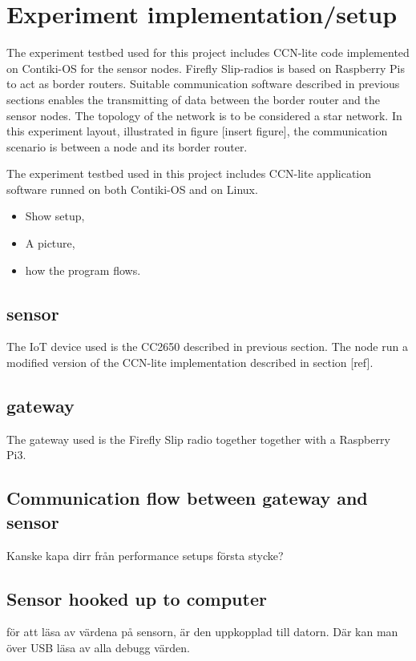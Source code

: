 \section{Experiment implementation/setup}
The experiment testbed used for this project includes CCN-lite code implemented on Contiki-OS for the sensor nodes. Firefly Slip-radios is based on Raspberry Pis to act as border routers. Suitable communication software described in previous sections enables the transmitting of data between the border router and the sensor nodes. The topology of the network is to be considered a star network. In this experiment layout, illustrated in figure [insert figure], the communication scenario is between a node and its border router.

The experiment testbed used in this project includes CCN-lite application software runned on both Contiki-OS and on Linux. 

\begin{itemize}
	\item Show setup,
	\item A picture,
	\item how the program flows.

\end{itemize}
\subsection{sensor}
The IoT device used is the CC2650 described in previous section. The node run a modified version of the CCN-lite implementation described in section [ref].

\subsection{gateway}
The gateway used is the Firefly Slip radio together together with a Raspberry Pi3. 


\subsection{Communication flow between gateway and sensor}
Kanske kapa dirr från performance setups första stycke?

\subsection{Sensor hooked up to computer}
för att läsa av värdena på sensorn, är den uppkopplad till datorn. Där kan man över USB läsa av alla debugg värden.

